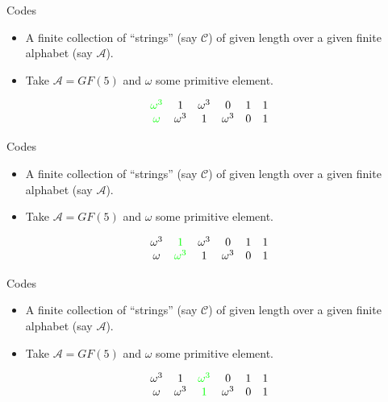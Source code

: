 \documentclass{beamer}
\newcommand{\A}{\mathcal{A}}
\newcommand{\C}{\mathscr{C}}
\newcommand{\ggreen}[1]{\textcolor{green}{#1}}
\begin{document}
 \begin{frame}{Codes}
 
 \begin{itemize}
  \item A finite collection of ``strings'' (say $\C$) of given length over a given finite alphabet (say $\A$).
  \item Take $\A = GF(5)$ and $\omega$ some primitive element.
 \end{itemize}
 
 \[
  \begin{array}{cccccc}
\ggreen{\omega^3} & 1 & \omega^3 & 0 & 1 & 1 \\
\ggreen{\omega} & \omega^3 & 1 & \omega^3 & 0 & 1
  \end{array}
 \]
 
 \end{frame}
 
 
\begin{frame}{Codes}
 
 \begin{itemize}
  \item A finite collection of ``strings'' (say $\C$) of given length over a given finite alphabet (say $\A$).
  \item Take $\A = GF(5)$ and $\omega$ some primitive element.
 \end{itemize}
 
 \[
  \begin{array}{cccccc}
\omega^3 & \ggreen{1} & \omega^3 & 0 & 1 & 1 \\
\omega & \ggreen{\omega^3} & 1 & \omega^3 & 0 & 1
  \end{array}
 \]
 
 \end{frame}

 
\begin{frame}{Codes}
 
 \begin{itemize}
  \item A finite collection of ``strings'' (say $\C$) of given length over a given finite alphabet (say $\A$).
  \item Take $\A = GF(5)$ and $\omega$ some primitive element.
 \end{itemize}
 
 \[
  \begin{array}{cccccc}
\omega^3 & 1 & \ggreen{\omega^3} & 0 & 1 & 1 \\
\omega & \omega^3 & \ggreen{1} & \omega^3 & 0 & 1
  \end{array}
 \]
 
 \end{frame}
 
\end{document}
